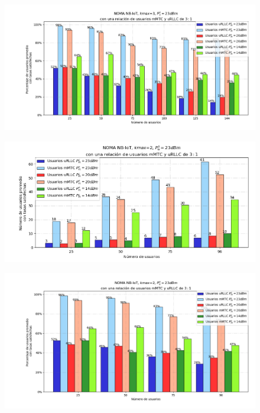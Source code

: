 \begin{figure}[th]
    \centering
    \includegraphics[scale=.6]{Figures/ResultadosNOMA/Kmax3_DiferentesPM_Porcentual.png}
    \decoRule
    \caption[]{}
    \label{fig:}
\end{figure}

\begin{figure}[th]
    \centering
    \includegraphics[scale=.5]{Figures/ResultadosNOMA/Kmax2_DiferentesPM.png}
    \decoRule
    \caption[]{}
    \label{fig:}
\end{figure}

\begin{figure}[th]
    \centering
    \includegraphics[scale=.6]{Figures/ResultadosNOMA/Kmax2_DiferentesPM_Porcentual.png}
    \decoRule
    \caption[]{}
    \label{fig:}
\end{figure}


